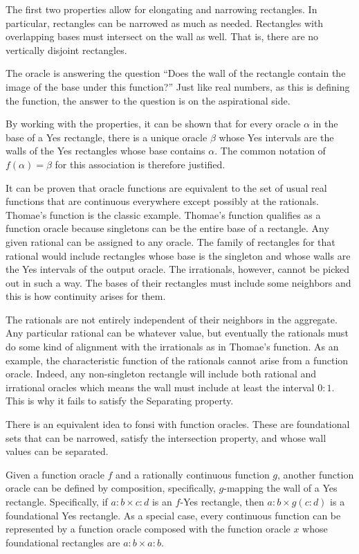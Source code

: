 \documentclass[12pt]{article}
\begin{document}
The first two properties allow for elongating and narrowing rectangles. In particular, rectangles can be narrowed as much as needed. Rectangles with overlapping bases must intersect on the wall as well. That is, there are no vertically disjoint rectangles. 

The oracle is answering the question ``Does the wall of the rectangle contain the image of the base under this function?'' Just like real numbers, as this is defining the function, the answer to the question is on the aspirational side. 

By working with the properties, it can be shown that for every oracle $\alpha$ in the base of a Yes rectangle, there is a unique oracle $\beta$ whose Yes intervals are the walls of the Yes rectangles whose base contains $\alpha$. The common notation of $f(\alpha) = \beta$ for this association is therefore justified. 

It can be proven that oracle functions are equivalent to the set of usual real functions that are continuous everywhere except possibly at the rationals. Thomae's function is the classic example. Thomae's function qualifies as a function oracle because singletons can be the entire base of a rectangle. Any given rational can be assigned to any oracle. The family of rectangles for that rational would include rectangles whose base is the singleton and whose walls are the Yes intervals of the output oracle. The irrationals, however, cannot be picked out in such a way. The bases of their rectangles must include some neighbors and this is how continuity arises for them.

The rationals are not entirely independent of their neighbors in the aggregate. Any particular rational can be whatever value, but eventually the rationals must do some kind of alignment with the irrationals as in Thomae's function. As an example, the characteristic function of the rationals cannot arise from a function oracle. Indeed, any non-singleton rectangle will include both rational and irrational oracles which means the wall must include at least the interval $0:1$. This is why it fails to satisfy the Separating property. 

There is an equivalent idea to fonsi with function oracles. These are foundational sets that can be narrowed, satisfy the intersection property, and whose wall values can be separated. 

Given a function oracle $f$ and a rationally continuous function $g$, another function oracle can be defined by composition, specifically, $g$-mapping the wall of a Yes rectangle. Specifically, if $a:b \times c:d$ is an $f$-Yes rectangle, then $a:b \times g(c:d)$ is a foundational Yes rectangle. As a special case, every continuous function can be represented by a function oracle composed with the function oracle $x$ whose foundational rectangles are $a:b \times a:b$.
\end{document}
